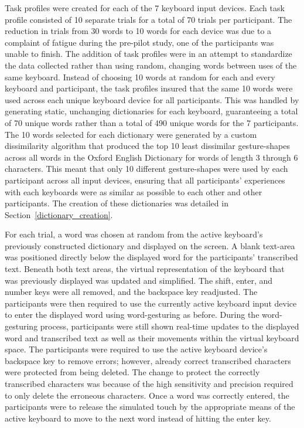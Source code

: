 Task profiles were created for each of the 7 keyboard input devices. Each task profile consisted of 10 separate trials for a total of 70 trials per participant. The reduction in trials from 30 words to 10 words for each device was due to a complaint of fatigue during the pre-pilot study, one of the participants was unable to finish. The addition of task profiles were in an attempt to standardize the data collected rather than using random, changing words between uses of the same keyboard. Instead of choosing 10 words at random for each and every keyboard and participant, the task profiles insured that the same 10 words were used across each unique keyboard device for all participants. This was handled by generating static, unchanging dictionaries for each keyboard, guaranteeing a total of 70 unique words rather than a total of 490 unique words for the 7 participants. The 10 words selected for each dictionary were generated by a custom dissimilarity algorithm that produced the top 10 least dissimilar gesture-shapes across all words in the Oxford English Dictionary for words of length 3 through 6 characters. This meant that only 10 different gesture-shapes were used by each participant across all input devices, ensuring that all participants' experiences with each keyboards were as similar as possible to each other and other participants. The creation of these dictionaries was detailed in Section~\ref{dictionary_creation}.

For each trial, a word was chosen at random from the active keyboard's previously constructed dictionary and displayed on the screen. A blank text-area was positioned directly below the displayed word for the participants' transcribed text. Beneath both text areas, the virtual representation of the keyboard that was previously displayed was updated and simplified. The shift, enter, and number keys were all removed, and the backspace key readjusted. The participants were then required to use the currently active keyboard input device to enter the displayed word using word-gesturing as before. During the word-gesturing process, participants were still shown real-time updates to the displayed word and transcribed text as well as their movements within the virtual keyboard space. The participants were required to use the active keyboard device's backspace key to remove errors; however, already correct transcribed characters were protected from being deleted. The change to protect the correctly transcribed characters was because of the high sensitivity and precision required to only delete the erroneous characters. Once a word was correctly entered, the participants were to release the simulated touch by the appropriate means of the active keyboard to move to the next word instead of hitting the enter key.

